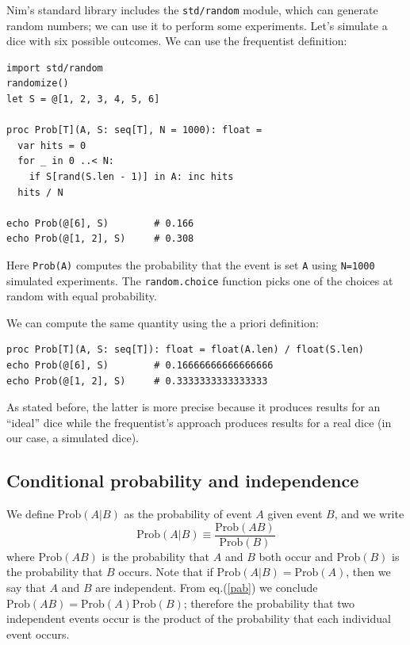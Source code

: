 \documentclass[justified, sixbynine]{tufte-book}
\def\ft{\small\tt}
\theoremstyle{plain}%
\newtheorem * {corollary}{Corollary}
\theoremstyle{definition}
\theoremstyle{remark}
\newtheorem * {remark}{Remark}
\newtheorem * {note}{Note}
\begin{document}
\begin{fullwidth}
Nim's standard library includes the {\ft std/random} module, which can generate random numbers; we can use it to perform some experiments.
Let's simulate a dice with six possible outcomes.
We can use the frequentist definition:

\begin{lstlisting}
import std/random
randomize()
let S = @[1, 2, 3, 4, 5, 6]

proc Prob[T](A, S: seq[T], N = 1000): float =
  var hits = 0
  for _ in 0 ..< N:
    if S[rand(S.len - 1)] in A: inc hits
  hits / N

echo Prob(@[6], S)        # 0.166
echo Prob(@[1, 2], S)     # 0.308
\end{lstlisting}
Here {\ft \textrm{Prob}(A)} computes the probability that the event is set {\ft A} using {\ft N=1000} simulated experiments.
The {\ft random.choice} function picks one of the choices at random with equal probability.

We can compute the same quantity using the a priori definition:

\begin{lstlisting}
proc Prob[T](A, S: seq[T]): float = float(A.len) / float(S.len)
echo Prob(@[6], S)        # 0.16666666666666666
echo Prob(@[1, 2], S)     # 0.3333333333333333
\end{lstlisting}

As stated before, the latter is more precise because it produces results for an ``ideal'' dice while the frequentist's approach produces results for a real dice (in our case, a simulated dice).

\goodbreak\subsection{Conditional probability and independence}

We define $\textrm{Prob}(A|B)$ as the probability of event $A$ given event $B$, and we
write
\begin{equation}
\textrm{Prob}(A|B)\equiv \frac{\textrm{Prob}(AB)}{\textrm{Prob}(B)}  \label{pab}
\end{equation}
where $\textrm{Prob}(AB)$ is the probability that $A$ and $B$ both occur and $\textrm{Prob}(B)$ is
the probability that $B$ occurs. Note that if $\textrm{Prob}(A|B)=\textrm{Prob}(A)$, then we say
that $A$ and $B$ are independent. From eq.(\ref{pab})
we conclude $\textrm{Prob}(AB)=\textrm{Prob}(A)\textrm{Prob}(B)$; therefore the probability that two
independent events occur is the product of the probability that each individual event
occurs.


\end{fullwidth}
\end{document}
